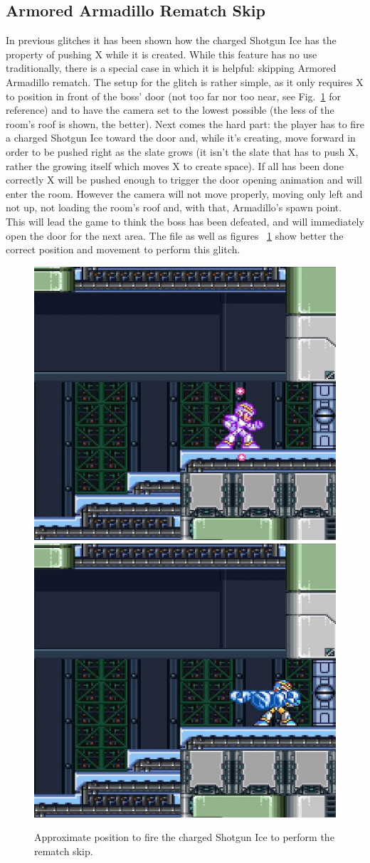 \subsection{Armored Armadillo Rematch Skip}\label{Armadillo_skip}
In previous glitches it has been shown how the charged Shotgun Ice has the property of pushing X while it is created. While this feature has no use traditionally, there is a special case in which it is helpful: skipping Armored Armadillo rematch. The setup for the glitch is rather simple, as it only requires X to position in front of the boss' door (not too far nor too near, see Fig.~\ref{Armadillo_skip_positioning} for reference) and to have the camera set to the lowest possible (the less of the room's roof is shown, the better). Next comes the hard part: the player has to fire a charged Shotgun Ice toward the door and, while it's creating, move forward in order to be pushed right as the slate grows (it isn't the slate that has to push X, rather the growing itself which moves X to create space). If all has been done correctly X will be pushed enough to trigger the door opening animation and will enter the room. However the camera will not move properly, moving only left and not up, not loading the room's roof and, with that, Armadillo's spawn point. This will lead the game to think the boss has been defeated, and will immediately open the door for the next area. The file  as well as figures ~\ref{Armadillo_skip_positioning} show better the correct position and movement to perform this glitch.
\begin{figure}[htp]
	\centering
	\includegraphics[width=0.45\linewidth]{figures/X1/Miscs/Dillo_skip_1.jpg}
	\includegraphics[width=0.45\linewidth]{figures/X1/Miscs/Dillo_skip_2.jpg}
	\caption{Approximate position to fire the charged Shotgun Ice to perform the rematch skip.}
	\label{Armadillo_skip_positioning}
\end{figure}
